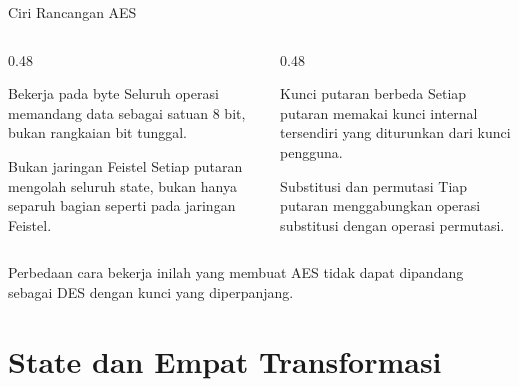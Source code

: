 \documentclass[aspectratio=169,11pt]{beamer}
\begin{document}
\begin{frame}{Ciri Rancangan AES}
    \footnotesize
    \begin{columns}[T,onlytextwidth]
        \begin{column}{0.48\textwidth}
            \begin{block}{Bekerja pada byte}
                Seluruh operasi memandang data sebagai satuan 8 bit, bukan
                rangkaian bit tunggal.
            \end{block}
            \begin{block}{Bukan jaringan Feistel}
                Setiap putaran mengolah seluruh state, bukan hanya separuh
                bagian seperti pada jaringan Feistel.
            \end{block}
        \end{column}
        \begin{column}{0.48\textwidth}
            \begin{block}{Kunci putaran berbeda}
                Setiap putaran memakai kunci internal tersendiri yang
                diturunkan dari kunci pengguna.
            \end{block}
            \begin{block}{Substitusi dan permutasi}
                Tiap putaran menggabungkan operasi substitusi dengan
                operasi permutasi.
            \end{block}
        \end{column}
    \end{columns}
    \vspace{0.15cm}
    Perbedaan cara bekerja inilah yang membuat AES tidak dapat dipandang
    sebagai DES dengan kunci yang diperpanjang.
\end{frame}

\section{State dan Empat Transformasi}
\end{document}

